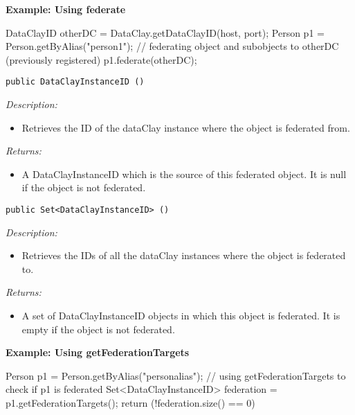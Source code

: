 \begin{tBox}
\textcolor{basecolor} {\bf Example: Using federate}
\begin{java}
DataClayID otherDC = DataClay.getDataClayID(host, port);
Person p1 = Person.getByAlias("person1");
// federating object and subobjects to otherDC (previously registered)
p1.federate(otherDC);
\end{java}
\end{tBox}


\begin{dBox}
\texttt{public DataClayInstanceID ()}
\LINE

{\it Description:}

\begin{itemize}
 \item Retrieves the ID of the dataClay instance where the object is federated from. 
\end{itemize}

{\it Returns:}

\begin{itemize}
 \item A DataClayInstanceID which is the source of this federated object.  
 It is null if the object is not federated.
\end{itemize}

\end{dBox}


\begin{dBox}
\texttt{public Set<DataClayInstanceID> ()}
\LINE

{\it Description:}

\begin{itemize}
 \item Retrieves the IDs of all the dataClay instances where the object is federated to. 
\end{itemize}

{\it Returns:}

\begin{itemize}
 \item A set of DataClayInstanceID objects in which this object is federated. 
 It is empty if the object is not federated.
\end{itemize}

\end{dBox}

\begin{tBox}
\textcolor{basecolor} {\bf Example: Using getFederationTargets}
\begin{java}
Person p1 = Person.getByAlias("personalias");
// using getFederationTargets to check if p1 is federated
Set<DataClayInstanceID> federation = p1.getFederationTargets();
return (!federation.size() == 0)
\end{java}
\end{tBox}

